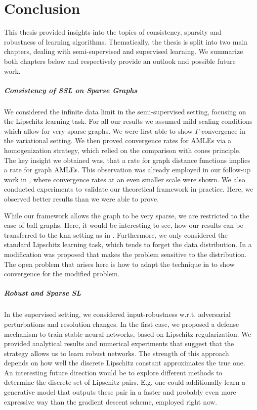 \chapter{Conclusion}\label{ch:C}
%
%
This thesis provided insights into the topics of consistency, sparsity and robustness of learning algorithms. Thematically, the thesis is split into two main chapters, dealing with semi-supervised and supervised learning. We summarize both chapters below and respectively provide an outlook and possible future work.

\paragraph{Consistency of SSL on Sparse Graphs} We considered the infinite data limit in the semi-supervised setting, focusing on the Lipschitz learning task. For all our results we assumed mild scaling conditions which allow for very sparse graphs. We were first able to show $\Gamma$-convergence in the variational setting. We then proved convergence rates for AMLEs via a homogenization strategy, which relied on the comparison with cones principle. The key insight we obtained was, that a rate for graph distance functions implies a rate for graph AMLEs. This observation was already employed in our follow-up work in \cite{bungert2022ratio}, where convergence rates at an even smaller scale were shown. We also conducted experiments to validate our theoretical framework in practice. Here, we observed better results than we were able to prove. 

While our framework allows the graph to be very sparse, we are restricted to the case of ball graphs. Here, it would be interesting to see, how our results can be transferred to the knn setting as in \cite{calder2022improved}. Furthermore, we only considered the standard Lipschitz learning task, which tends to forget the data distribution. In \cite{calder2019consistency} a modification was proposed that makes the problem sensitive to the distribution. The open problem that arises here is how to adapt the technique in \cite{bungert2021uniform} to show convergence for the modified problem.\par

\paragraph{Robust and Sparse SL} In the supervised setting, we considered input-robustness w.r.t. adversarial perturbations and resolution changes. In the first case, we proposed a defense mechanism to train stable neural networks, based on Lipschitz regularization. We provided analytical results and numerical experiments that suggest that the strategy allows us to learn robust networks. The strength of this approach depends on how well the discrete Lipschitz constant approximates the true one. An interesting future direction would be to explore different methods to determine the discrete set of Lipschitz pairs. E.g. one could additionally learn a generative model that outputs these pair in a faster and probably even more expressive way than the gradient descent scheme, employed right now.

